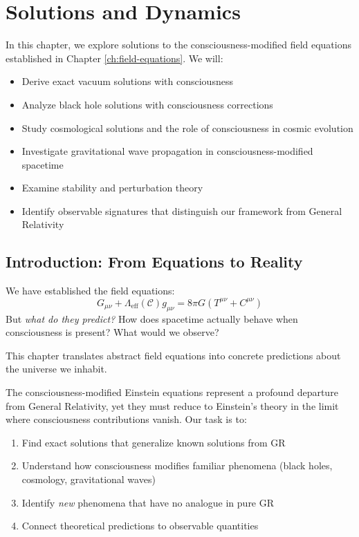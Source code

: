 \chapter{Solutions and Dynamics}
\label{ch:solutions-dynamics}

\begin{chapterobjectives}
In this chapter, we explore solutions to the consciousness-modified field equations established in Chapter \ref{ch:field-equations}. We will:
\begin{itemize}
\item Derive exact vacuum solutions with consciousness
\item Analyze black hole solutions with consciousness corrections
\item Study cosmological solutions and the role of consciousness in cosmic evolution
\item Investigate gravitational wave propagation in consciousness-modified spacetime
\item Examine stability and perturbation theory
\item Identify observable signatures that distinguish our framework from General Relativity
\end{itemize}
\end{chapterobjectives}

\section{Introduction: From Equations to Reality}

\begin{intuitive}
We have established the field equations:
\begin{equation}
G_{\mu\nu} + \Lambda_{\text{eff}}(\mathcal{C}) g_{\mu\nu} = 8\pi G \left( T^{\mu\nu} + C^{\mu\nu} \right)
\end{equation}
But \textit{what do they predict?} How does spacetime actually behave when consciousness is present? What would we observe?

This chapter translates abstract field equations into concrete predictions about the universe we inhabit.
\end{intuitive}

The consciousness-modified Einstein equations represent a profound departure from General Relativity, yet they must reduce to Einstein's theory in the limit where consciousness contributions vanish. Our task is to:
\begin{enumerate}
\item Find exact solutions that generalize known solutions from GR
\item Understand how consciousness modifies familiar phenomena (black holes, cosmology, gravitational waves)
\item Identify \textit{new} phenomena that have no analogue in pure GR
\item Connect theoretical predictions to observable quantities
\end{enumerate}

